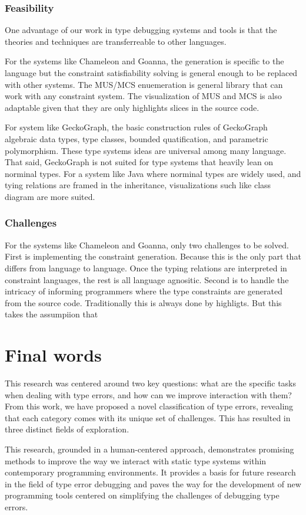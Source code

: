 \subsubsection{Feasibility}

One advantage of our work in type debugging systems and tools is that the theories and techniques are transferreable to other languages.  

For the systems like Chameleon and Goanna, the generation is specific to the language but the constraint satisfiability solving is general enough to be replaced with other systems. The MUS/MCS enuemeration is general library that can work with any constraint system. The visualization of MUS and MCS is also adaptable given that they are only highlights slices in the source code.

For system like GeckoGraph, the basic construction rules of GeckoGraph algebraic data types, type classes, bounded quatification, and parametric polymorphism. These type systems ideas are universal among many language. That said, GeckoGraph is not suited for type systems that heavily lean on norminal types. For a system like Java where norminal types are widely used, and tying relations are framed in the inheritance, visualizations such like class diagram are more suited. 



\subsubsection{Challenges}

For the systems like Chameleon and Goanna, only two challenges to be solved. First is implementing the constraint generation. Because this is the only part that differs from language to language. Once the typing relations are interpreted in constraint languages, the rest is all language agnositic.  Second is to handle the intricacy of informing programmers where the type constraints are generated from the source code. Traditionally this is always done by highligts. But this takes the assumpiion that 


\section{Final words}

This research was centered around two key questions: what are the specific tasks when dealing with type errors, and how can we improve interaction with them? From this work, we have proposed a novel classification of type errors, revealing that each category comes with its unique set of challenges. This has resulted in three distinct fields of exploration. 

This research, grounded in a human-centered approach, demonstrates promising methods to improve the way we interact with static type systems within contemporary programming environments. It provides a basis for future research in the field of type error debugging and paves the way for the development of new programming tools centered on simplifying the challenges of debugging type errors. 
